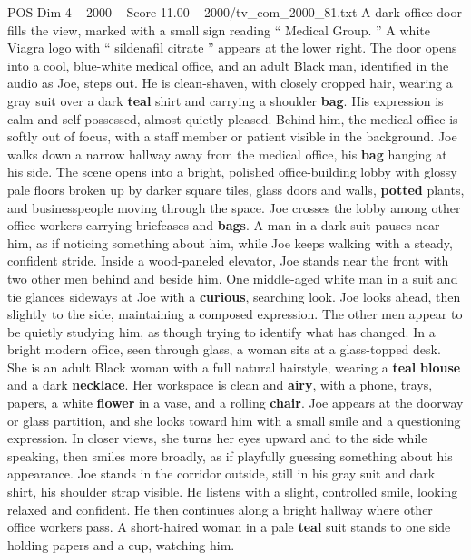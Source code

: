 \begin{textsample}{POS Dim 4 – 2000 – Score 11.00 – 2000/tv\_com\_2000\_81.txt}  \label{ex:f4_pos_060}
A dark office door fills the view, marked with a small sign reading “ Medical Group. ” A white Viagra logo with “ sildenafil citrate ” appears at the lower right.
The door opens into a cool, blue-white medical office, and an adult Black man, identified in the audio as Joe, steps out.
He is clean-shaven, with closely cropped hair, wearing a gray suit over a dark \textbf{teal} shirt and carrying a shoulder \textbf{bag}.
His expression is calm and self-possessed, almost quietly pleased.
Behind him, the medical office is softly out of focus, with a staff member or patient visible in the background.
Joe walks down a narrow hallway away from the medical office, his \textbf{bag} hanging at his side.
The scene opens into a bright, polished office-building lobby with glossy pale floors broken up by darker square tiles, glass doors and walls, \textbf{potted} plants, and businesspeople moving through the space.
Joe crosses the lobby among other office workers carrying briefcases and \textbf{bags}.
A man in a dark suit pauses near him, as if noticing something about him, while Joe keeps walking with a steady, confident stride.
Inside a wood-paneled elevator, Joe stands near the front with two other men behind and beside him.
One middle-aged white man in a suit and tie glances sideways at Joe with a \textbf{curious}, searching look.
Joe looks ahead, then slightly to the side, maintaining a composed expression.
The other men appear to be quietly studying him, as though trying to identify what has changed.
In a bright modern office, seen through glass, a woman sits at a glass-topped desk.
She is an adult Black woman with a full natural hairstyle, wearing a \textbf{teal} \textbf{blouse} and a dark \textbf{necklace}.
Her workspace is clean and \textbf{airy}, with a phone, trays, papers, a white \textbf{flower} in a vase, and a rolling \textbf{chair}.
Joe appears at the doorway or glass partition, and she looks toward him with a small smile and a questioning expression.
In closer views, she turns her eyes upward and to the side while speaking, then smiles more broadly, as if playfully guessing something about his appearance.
Joe stands in the corridor outside, still in his gray suit and dark shirt, his shoulder strap visible.
He listens with a slight, controlled smile, looking relaxed and confident.
He then continues along a bright hallway where other office workers pass.
A short-haired woman in a pale \textbf{teal} suit stands to one side holding papers and a cup, watching him.

\end{textsample}

